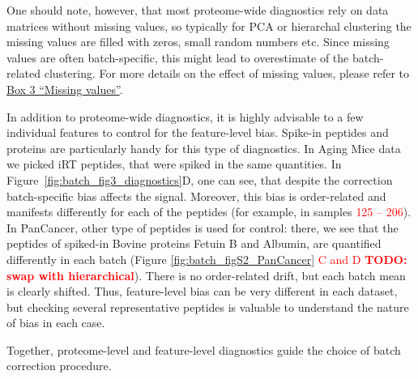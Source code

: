 \documentclass[num-refs]{wiley-article}
\begin{document}
One should note, however, that most proteome-wide diagnostics rely on data matrices without missing values, so typically for PCA or hierarchal clustering the missing values are filled with zeros, small random numbers etc. Since missing values are often batch-specific, this might lead to overestimate of the batch-related clustering. For more details on the effect of missing values, please refer to \hyperref[box:Box3_missingness]{Box 3 “Missing values”}.

In addition to proteome-wide diagnostics, it is highly advisable to a few individual features to control for the feature-level bias. Spike-in peptides and proteins are particularly handy for this type of diagnostics. In Aging Mice data we picked iRT peptides, that were spiked in the same quantities. In Figure~\ref{fig:batch_fig3_diagnostics}D, one can see, that despite the correction batch-specific bias affects the signal. Moreover, this bias is order-related and manifests differently for each of the peptides (for example, in samples \textcolor{red}{125 – 206}). In PanCancer, other type of peptides is used for control: there, we see that the peptides of spiked-in Bovine proteins Fetuin B and Albumin, are quantified differently in each batch (Figure \ref{fig:batch_figS2_PanCancer} \textcolor{red}{C and D \textbf{TODO: swap with hierarchical}}). There is no order-related drift, but each batch mean is clearly shifted. Thus, feature-level bias can be very different in each dataset, but checking several representative peptides is valuable to understand the nature of bias in each case.

Together, proteome-level and feature-level diagnostics guide the choice of batch correction procedure.
\end{document}
